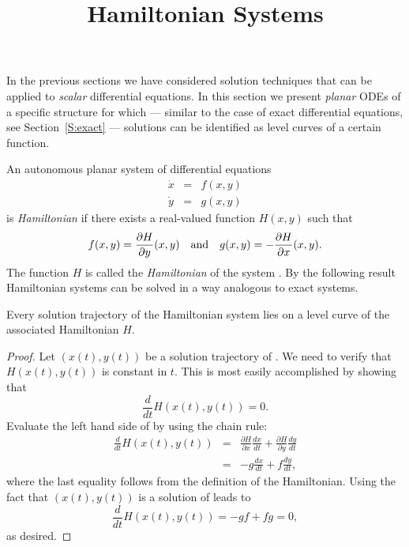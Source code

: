 \documentclass{ximera}
\title{Hamiltonian Systems}
\begin{document}
\begin{abstract}
\end{abstract}
\maketitle


\label{sec:HamSys}

In the previous sections we have considered solution techniques that
can be applied to {\em scalar\/} differential equations.  In this section 
we present {\em planar\/} ODEs of a specific structure for which 
--- similar to the case of exact differential equations, see 
Section~\ref{S:exact} --- solutions
can be identified as level curves of a certain function.

An autonomous planar system of differential equations 
\begin{equation}  \label{e:ham}
\begin{array}{rcl} 
\dot{x} & = & f(x,y) \\
\dot{y} & = & g(x,y) 
\end{array}
\end{equation}
is {\em Hamiltonian\/} if there exists a real-valued
function $H(x,y)$ such that 
\[
f(x,y) = \frac{\partial H}{\partial y}(x,y) \quad\mbox{and}\quad 
g(x,y) =-\frac{\partial H}{\partial x}(x,y).
\]
The function $H$ is called the {\em Hamiltonian\/}
of the system .
By the following result Hamiltonian systems can be solved in a way analogous 
to exact systems.

\begin{thm}
Every solution trajectory of the Hamiltonian system  lies
on a level curve of the associated Hamiltonian $H$.
\end{thm}

\begin{proof} 
Let $(x(t),y(t))$ be a solution trajectory of .  We need to 
verify that $H(x(t),y(t))$ is constant in $t$.  This is most easily 
accomplished by showing that 
\begin{equation} \label{e:dH=0}
\frac{d}{dt} H(x(t),y(t)) = 0.
\end{equation}
Evaluate the left hand side of  by using the chain rule:
\begin{eqnarray*}
\frac{d}{dt} H(x(t),y(t)) & = & \frac{\partial H}{\partial x}\frac{dx}{dt}
+ \frac{\partial H}{\partial y} \frac{dy}{dt} \\
& = & -g\frac{dx}{dt} + f\frac{dy}{dt}, 
\end{eqnarray*}
where the last equality follows from the definition of the Hamiltonian.  
Using the fact that $(x(t),y(t))$ is a solution of  leads to 
\[
 \frac{d}{dt} H(x(t),y(t)) = -gf+fg = 0,
\]
as desired.  \end{proof}
\end{document}

